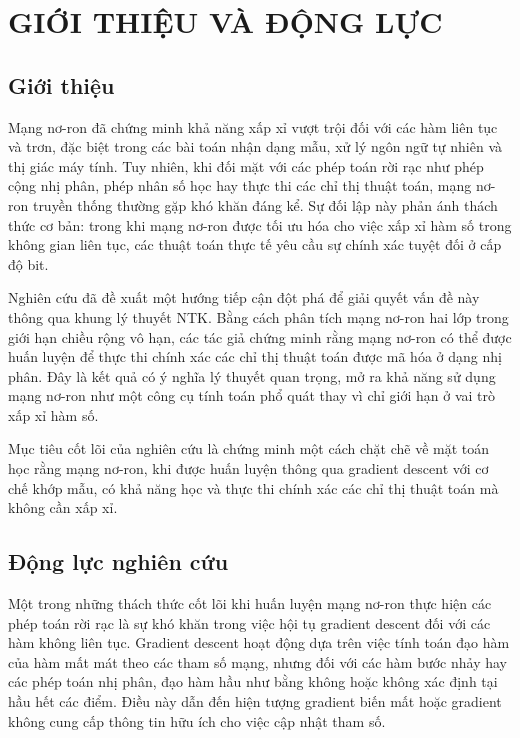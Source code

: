 \chapter{GIỚI THIỆU VÀ ĐỘNG LỰC}

\section{Giới thiệu}

Mạng nơ-ron đã chứng minh khả năng xấp xỉ vượt trội đối với các hàm liên tục và trơn, đặc biệt trong các bài toán nhận dạng mẫu, xử lý ngôn ngữ tự nhiên và thị giác máy tính. Tuy nhiên, khi đối mặt với các phép toán rời rạc như phép cộng nhị phân, phép nhân số học hay thực thi các chỉ thị thuật toán, mạng nơ-ron truyền thống thường gặp khó khăn đáng kể. Sự đối lập này phản ánh thách thức cơ bản: trong khi mạng nơ-ron được tối ưu hóa cho việc xấp xỉ hàm số trong không gian liên tục, các thuật toán thực tế yêu cầu sự chính xác tuyệt đối ở cấp độ bit.

Nghiên cứu đã đề xuất một hướng tiếp cận đột phá để giải quyết vấn đề này thông qua khung lý thuyết NTK. Bằng cách phân tích mạng nơ-ron hai lớp trong giới hạn chiều rộng vô hạn, các tác giả chứng minh rằng mạng nơ-ron có thể được huấn luyện để thực thi chính xác các chỉ thị thuật toán được mã hóa ở dạng nhị phân. Đây là kết quả có ý nghĩa lý thuyết quan trọng, mở ra khả năng sử dụng mạng nơ-ron như một công cụ tính toán phổ quát thay vì chỉ giới hạn ở vai trò xấp xỉ hàm số.

Mục tiêu cốt lõi của nghiên cứu là chứng minh một cách chặt chẽ về mặt toán học rằng mạng nơ-ron, khi được huấn luyện thông qua gradient descent với cơ chế khớp mẫu, có khả năng học và thực thi chính xác các chỉ thị thuật toán mà không cần xấp xỉ.

\section{Động lực nghiên cứu}

Một trong những thách thức cốt lõi khi huấn luyện mạng nơ-ron thực hiện các phép toán rời rạc là sự khó khăn trong việc hội tụ gradient descent đối với các hàm không liên tục. Gradient descent hoạt động dựa trên việc tính toán đạo hàm của hàm mất mát theo các tham số mạng, nhưng đối với các hàm bước nhảy hay các phép toán nhị phân, đạo hàm hầu như bằng không hoặc không xác định tại hầu hết các điểm. Điều này dẫn đến hiện tượng gradient biến mất hoặc gradient không cung cấp thông tin hữu ích cho việc cập nhật tham số.

